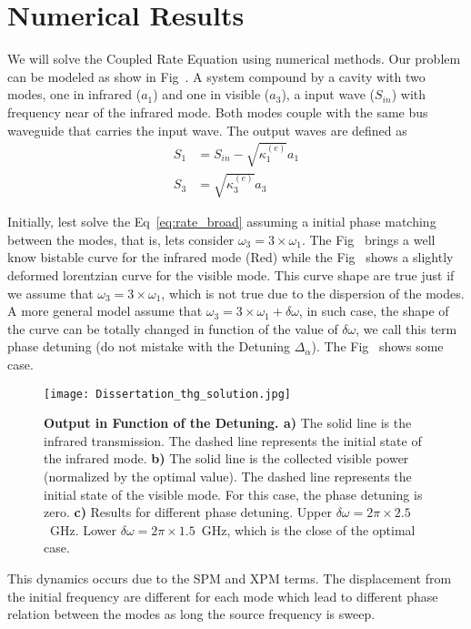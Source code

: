 \section{Numerical Results}

We will solve the Coupled Rate Equation using numerical methods. Our problem can be modeled as show in Fig~. A system compound by a cavity with two modes, one in infrared ($a_1$) and one in visible ($a_3$), a input wave ($S_{in}$) with frequency near of the infrared mode. Both modes couple with the same bus waveguide that carries the input wave. The output waves are defined as 
\begin{subequations}
    \begin{align}
        S_1 &= S_{in} - \sqrt{\kappa^{(e)}_1}a_1\\
        S_3 &= \sqrt{\kappa^{(e)}_3}a_3
        \label{eq:out_wave}
    \end{align}
\end{subequations}

Initially, lest solve the Eq~\ref{eq:rate_broad} assuming a initial phase matching between the modes, that is, lets consider $\omega_3 = 3\times\omega_1$. The Fig~
brings a well know bistable curve for the infrared mode (Red) while the Fig~ 
shows a slightly deformed lorentzian curve for the visible mode. This curve shape are true just if we assume that $\omega_3 = 3\times\omega_1$, which is not true due to the dispersion of the modes. A more general model assume that $\omega_3 = 3\times\omega_1 + \delta\omega$, in such case, the shape of the curve can be totally changed in function of the value of $\delta\omega$, we call this term phase detuning (do not mistake with the Detuning $\Delta_\alpha$). The Fig~
shows some case. 

\begin{figure}[!h]
    \centering
    \texttt{[image: Dissertation\_thg\_solution.jpg]}
    \caption{\textbf{Output in Function of the Detuning. a)} The solid line is the infrared transmission. The dashed line represents the initial state of the infrared mode. \textbf{b)} The solid line is the collected visible power (normalized by the optimal value). The dashed line represents the initial state of the visible mode. For this case, the phase detuning is zero. \textbf{c)} Results for different phase detuning. Upper $\delta\omega = 2\pi\times2.5$~GHz. Lower $\delta\omega = 2\pi\times1.5$~GHz, which is the close of the optimal case.}
    \label{fig:temporal_solution}
\end{figure}
This dynamics occurs due to the SPM and XPM terms. The displacement from the initial frequency are different for each mode which lead to different phase relation between the modes as long the source frequency is sweep. 

